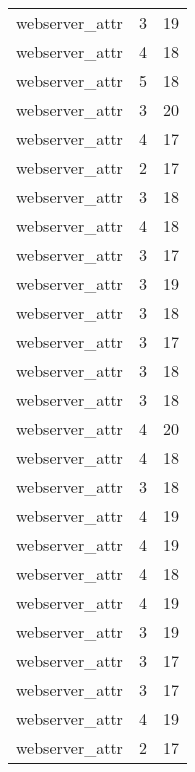 \begin{table}
\begin{tabular}{lrr}
                  webserver\_attr &         3 &        19 \\
                  webserver\_attr &         4 &        18 \\
                  webserver\_attr &         5 &        18 \\
                  webserver\_attr &         3 &        20 \\
                  webserver\_attr &         4 &        17 \\
                  webserver\_attr &         2 &        17 \\
                  webserver\_attr &         3 &        18 \\
                  webserver\_attr &         4 &        18 \\
                  webserver\_attr &         3 &        17 \\
                  webserver\_attr &         3 &        19 \\
                  webserver\_attr &         3 &        18 \\
                  webserver\_attr &         3 &        17 \\
                  webserver\_attr &         3 &        18 \\
                  webserver\_attr &         3 &        18 \\
                  webserver\_attr &         4 &        20 \\
                  webserver\_attr &         4 &        18 \\
                  webserver\_attr &         3 &        18 \\
                  webserver\_attr &         4 &        19 \\
                  webserver\_attr &         4 &        19 \\
                  webserver\_attr &         4 &        18 \\
                  webserver\_attr &         4 &        19 \\
                  webserver\_attr &         3 &        19 \\
                  webserver\_attr &         3 &        17 \\
                  webserver\_attr &         3 &        17 \\
                  webserver\_attr &         4 &        19 \\
                  webserver\_attr &         2 &        17 \\

\end{tabular}
\end{table}
